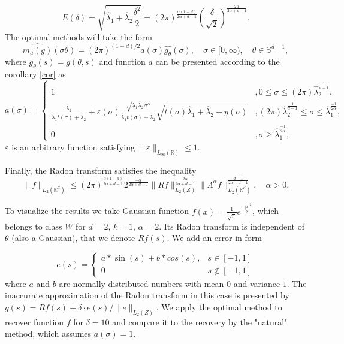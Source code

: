 \documentclass[12pt]{iopart}
\begin{document}
	$$
	E(\delta)=\sqrt{\widehat\lambda_1+\widehat\lambda_2\frac{\delta^2}{2}}=(2\pi)^{\frac{\alpha(1-d)}{2\alpha+d-1}}\left(\frac{\delta}{\sqrt{2}}\right)^{\frac{2\alpha}{2\alpha+d-1}}.
	$$
	The optimal methods will take the form 
	$$
	\widehat{m_a(g)}(\sigma\theta)=(2\pi)^{(1-d)/2}a(\sigma)\widehat{g_\theta }(\sigma),\quad \sigma\in[0,\infty),\quad \theta\in\mathbb S^{d-1},
	$$
	where $g_{\theta}(s)=g(\theta,s)$ and function $a$ can be presented according to the corollary \ref{cor} as
	$$
	a(\sigma)=
	\begin{cases}
	1& ,0\leqslant\sigma\leqslant (2\pi)\widehat\lambda_2^\frac{1}{d-1},\\
	\frac{\widehat\lambda_2}{\widehat\lambda_1t(\sigma)+\widehat\lambda_2}+\varepsilon(\sigma)\frac{\sqrt{\widehat\lambda_1\widehat\lambda_2}\sigma^\alpha}{\widehat\lambda_1t(\sigma)+\widehat\lambda_2}\sqrt{t(\sigma)\widehat\lambda_1+\widehat\lambda_2-y(\sigma)}& ,(2\pi)\widehat\lambda_2^\frac{1}{d-1} \leqslant\sigma\leqslant\widehat\lambda_1^{\frac{-1}{2\alpha}},\\
	0 &,\sigma\geqslant\widehat\lambda_1^{\frac{-1}{2\alpha}},
	\end{cases}
	$$
	$\varepsilon$ is an arbitrary function satisfying $\|\varepsilon\|_{L_\infty(\mathbb R)}\leqslant 1$.
	
	Finally, the Radon transform satisfies the inequality
	$$
	\|f\|_{L_2(\mathbb R^d)}\leqslant
	(2\pi)^{\frac{\alpha(1-d)}{2\alpha+d-1}}2^{\frac{-\alpha}{2\alpha+d-1}}\|Rf\|_{L_2(Z)}^{\frac{2\alpha}{2\alpha+d-1}}\|\Lambda^\alpha f\|_{L_2(\mathbb
		R^d)}^\frac{d-1}{2\alpha+d-1},\quad \alpha>0.
	$$
	
	To visualize the results we take Gaussian function $f(x)=\frac{1}{\sqrt{\pi}}e^\frac{-|x|^2}{2}$, which belongs to class $W$ for $d=2$, $k=1$, $\alpha = 2$. Its Radon transform is independent of $\theta$ (also a Gaussian), that we denote $Rf(s)$. We add an error in form 
	
	$$e(s) = \begin{cases}
	a*\sin(s)+b*cos(s), & s\in[-1,1] \\
	0 & s\notin[-1,1]
	\end{cases}
	$$
	where $a$ and $b$ are normally distributed numbers with mean $0$ and variance $1$. The inaccurate approximation of the Radon transform in this case is presented by $g(s)=Rf(s)+\delta \cdot e(s)/\|e\|_{L_2(Z)}$. We apply the optimal method to recover function $f$ for $\delta=10$ and compare it to the recovery by the "natural" method, which assumes $a(\sigma)=1$.
	
\end{document}
